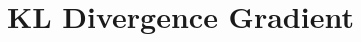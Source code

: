\documentclass[12pt]{article}
\begin{document}
\section{KL Divergence Gradient}
    

{}

\end{document}
